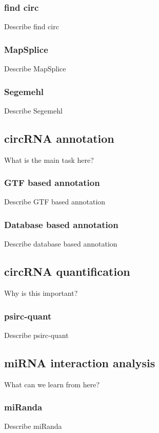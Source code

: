 \subsubsection{find circ}
Describe find circ

\subsubsection{MapSplice}
Describe MapSplice

\subsubsection{Segemehl}
Describe Segemehl

\subsection{circRNA annotation}
What is the main task here?

\subsubsection{GTF based annotation}
Describe GTF based annotation

\subsubsection{Database based annotation}
Describe database based annotation

\subsection{circRNA quantification}

Why is this important?

\subsubsection{psirc-quant}
Describe psirc-quant

\subsection{miRNA interaction analysis}
What can we learn from here?

\subsubsection{miRanda}
Describe miRanda

